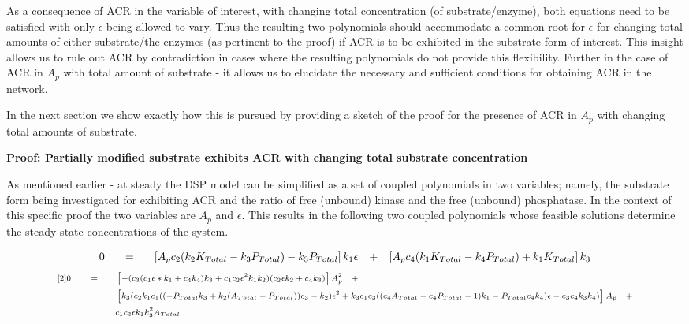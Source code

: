 \documentclass[9pt,lineno]{elife}
\begin{document}
\begin{appendixbox}
As a consequence of ACR in the variable of interest, with changing total concentration (of substrate/enzyme), both equations need to be satisfied with only $\epsilon$ being allowed to vary. Thus the resulting two polynomials should accommodate a common root for $\epsilon$ for changing total amounts of either substrate/the enzymes (as pertinent to the proof) if ACR is to be exhibited in the substrate form of interest. This insight allows us to rule out ACR by contradiction in cases where the resulting polynomials do not provide this flexibility. Further in the case of ACR in $A_p$ with total amount of substrate - it allows us to elucidate the necessary and sufficient conditions for obtaining ACR in the network. 

In the next section we show exactly how this is pursued by providing a sketch of the proof for the presence of ACR in $A_p$ with changing total amounts of substrate.

\noindent \textbf{Proof: Partially modified substrate exhibits ACR with changing total substrate concentration}

As mentioned earlier - at steady the DSP model can be simplified as a set of coupled polynomials in two variables; namely, the substrate form being investigated for exhibiting ACR and the ratio of free (unbound) kinase and the free (unbound) phosphatase. In the context of this specific proof the two variables are $A_p$ and $\epsilon$. This results in the following two coupled polynomials whose feasible solutions determine the steady state concentrations of the system. 

\begin{equation}
\scriptsize{
    0 \qquad = \qquad \left[ A_pc_2(k_2K_{Total}-k_3P_{Total})-k_3P_{Total} \right] k_1 \epsilon \quad + \quad \left[ A_pc_4(k_1K_{Total} - k_4P_{Total})  +k_1K_{Total}\right]k_3 }
    \label{Proof_ACR1} 
\end{equation}  
\begin{equation}
\scriptsize{
    \begin{aligned}[2]
        0 \qquad = \qquad & \left[-(c_3(c_1\epsilon*k_1 + c_4k_4)k_3 + c_1c_2\epsilon^2k_1k_2)(c_2\epsilon k_2 + c_4k_3)\right]A_p^2 \quad +  \\
        & \left[ k_3(c_2k_1c_1((-P_{Total}k_3 + k_2(A_{Total} - P_{Total}))c_3 - k_2)\epsilon^2 + k_3c_1c_3((c_4A_{Total} - c_4P_{Total} - 1)k_1 - P_{Total}c_4k_4)\epsilon - c_3c_4k_3k_4)\right] A_p \quad +  \\
        & c_1c_3\epsilon k_1k_3^2A_{Total} 
    \end{aligned} }
    \label{Proof_ACR2}
\end{equation}


\end{appendixbox}
\end{document}
